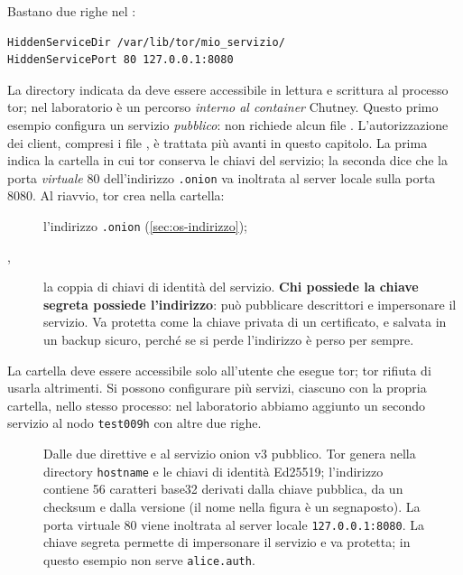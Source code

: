 Bastano due righe nel :
\begin{lstlisting}[language=torrc]
HiddenServiceDir /var/lib/tor/mio_servizio/
HiddenServicePort 80 127.0.0.1:8080
\end{lstlisting}
La directory indicata da  deve essere accessibile in lettura e scrittura al processo tor; nel laboratorio è un percorso \emph{interno al container} Chutney. Questo primo esempio configura un servizio \emph{pubblico}: non richiede alcun file . L'autorizzazione dei client, compresi i file , è trattata più avanti in questo capitolo.
La prima indica la cartella in cui tor conserva le chiavi del servizio; la seconda dice che la porta \emph{virtuale} 80 dell'indirizzo \texttt{.onion} va inoltrata al server locale sulla porta 8080. Al riavvio, tor crea nella cartella:
\begin{description}
  \item[] l'indirizzo \texttt{.onion} (\cref{sec:os-indirizzo});
  \item[, ] la coppia di chiavi di identità del servizio. \textbf{Chi possiede la chiave segreta possiede l'indirizzo}: può pubblicare descrittori e impersonare il servizio. Va protetta come la chiave privata di un certificato, e salvata in un backup sicuro, perché se si perde l'indirizzo è perso per sempre.
\end{description}
La cartella deve essere accessibile solo all'utente che esegue tor; tor rifiuta di usarla altrimenti. Si possono configurare più servizi, ciascuno con la propria cartella, nello stesso processo: nel laboratorio abbiamo aggiunto un secondo servizio al nodo \texttt{test009h} con altre due righe.

\begin{figure}[htbp]
\centering

\caption{Dalle due direttive  e  al servizio onion v3 pubblico. Tor genera nella directory \texttt{hostname} e le chiavi di identità Ed25519; l'indirizzo contiene 56 caratteri base32 derivati dalla chiave pubblica, da un checksum e dalla versione (il nome nella figura è un segnaposto). La porta virtuale 80 viene inoltrata al server locale \texttt{127.0.0.1:8080}. La chiave segreta permette di impersonare il servizio e va protetta; in questo esempio non serve \texttt{alice.auth}.}
\label{fig:servizio}
\end{figure}

